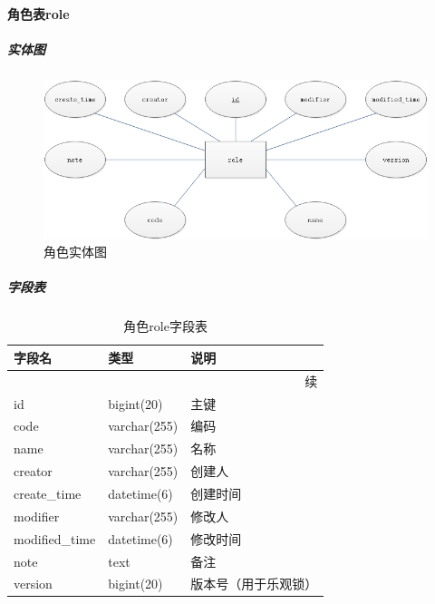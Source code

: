 \documentclass[titlepage,UTF8,linespread=1.5]{ctexart}
\begin{document}
\paragraph{角色表role}
\subparagraph{实体图}
\begin{figure}[H]
    \centering
    \includegraphics[width=140mm]{entity-role.png}
    \caption{角色实体图}
    \label{fig:entity-role}
\end{figure}
\subparagraph{字段表}
\begin{longtable}{|p{10em}|p{6em}|p{15em}|}
    \caption{角色role字段表}\label{tab:table_role}       \\\hline
    字段名         & 类型         & 说明                 \\\hline
    \endfirsthead
    \multicolumn{3}{r}{{续\tablename\thetable{}}}        \\\hline
    \endhead
    id             & bigint(20)   & 主键                 \\\hline
    code           & varchar(255) & 编码                 \\\hline
    name           & varchar(255) & 名称                 \\\hline
    creator        & varchar(255) & 创建人               \\\hline
    create\_time   & datetime(6)  & 创建时间             \\\hline
    modifier       & varchar(255) & 修改人               \\\hline
    modified\_time & datetime(6)  & 修改时间             \\\hline
    note           & text         & 备注                 \\\hline
    version        & bigint(20)   & 版本号（用于乐观锁） \\\hline
\end{longtable}\par
\end{document}
